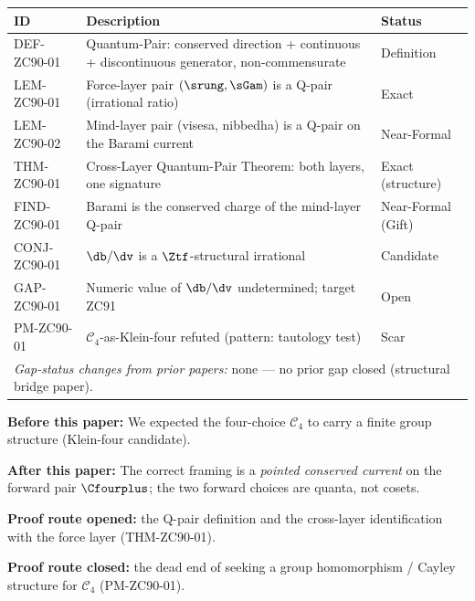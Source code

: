 \documentclass[12pt, a4paper]{article}
\begin{document}
\begin{formalbox}[title={Atomic Registry --- ZC90}]
\begin{center}
\renewcommand{\arraystretch}{1.3}
\small
\begin{tabular}{lp{8.0cm}l}
\toprule
\textbf{ID} & \textbf{Description} & \textbf{Status} \\
\midrule
DEF-ZC90-01
  & Quantum-Pair: conserved direction + continuous + discontinuous
    generator, non-commensurate
  & Definition \\[3pt]
LEM-ZC90-01
  & Force-layer pair $(\srung,\sGam)$ is a Q-pair (irrational ratio)
  & Exact \\[3pt]
LEM-ZC90-02
  & Mind-layer pair (visesa, nibbedha) is a Q-pair on the Barami current
  & Near-Formal \\[3pt]
THM-ZC90-01
  & Cross-Layer Quantum-Pair Theorem: both layers, one signature
  & Exact (structure) \\[3pt]
FIND-ZC90-01
  & Barami is the conserved charge of the mind-layer Q-pair
  & Near-Formal (Gift) \\[3pt]
CONJ-ZC90-01
  & $\db/\dv$ is a $\Ztf$-structural irrational
  & Candidate \\[3pt]
GAP-ZC90-01
  & Numeric value of $\db/\dv$ undetermined; target ZC91
  & Open \\[3pt]
PM-ZC90-01
  & $\mathcal{C}_4$-as-Klein-four refuted (pattern: tautology test)
  & Scar \\[3pt]
\midrule
\multicolumn{3}{l}{\emph{Gap-status changes from prior papers:} none ---
  no prior gap closed (structural bridge paper).} \\
\bottomrule
\end{tabular}
\end{center}
\end{formalbox}

\begin{derivedbox}[title={Reframe: $\mathcal{C}_4$ as a group
  $\to$ $\mathcal{C}_4^{+}$ as a conserved current}]
\textbf{Before this paper:} We expected the four-choice $\mathcal{C}_4$ to
carry a finite group structure (Klein-four candidate).

\textbf{After this paper:} The correct framing is a \emph{pointed
conserved current} on the forward pair $\Cfourplus$; the two forward
choices are quanta, not cosets.

\textbf{Proof route opened:} the Q-pair definition and the cross-layer
identification with the force layer (THM-ZC90-01).

\textbf{Proof route closed:} the dead end of seeking a group
homomorphism / Cayley structure for $\mathcal{C}_4$ (PM-ZC90-01).
\end{derivedbox}
\end{document}
